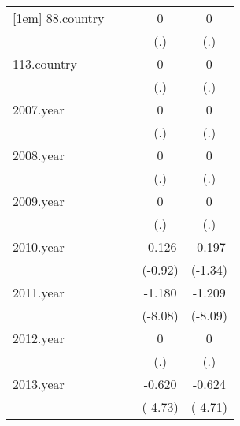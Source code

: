 {\begin{tabular}{l*{4}{c}}
[1em]
88.country  &                     &                     &           0         &           0         \\
            &                     &                     &         (.)         &         (.)         \\
[1em]
113.country &                     &                     &           0         &           0         \\
            &                     &                     &         (.)         &         (.)         \\
[1em]
2007.year   &                     &                     &           0         &           0         \\
            &                     &                     &         (.)         &         (.)         \\
[1em]
2008.year   &                     &                     &           0         &           0         \\
            &                     &                     &         (.)         &         (.)         \\
[1em]
2009.year   &                     &                     &           0         &           0         \\
            &                     &                     &         (.)         &         (.)         \\
[1em]
2010.year   &                     &                     &      -0.126         &      -0.197         \\
            &                     &                     &     (-0.92)         &     (-1.34)         \\
[1em]
2011.year   &                     &                     &      -1.180\sym{***}&      -1.209\sym{***}\\
            &                     &                     &     (-8.08)         &     (-8.09)         \\
[1em]
2012.year   &                     &                     &           0         &           0         \\
            &                     &                     &         (.)         &         (.)         \\
[1em]
2013.year   &                     &                     &      -0.620\sym{***}&      -0.624\sym{***}\\
            &                     &                     &     (-4.73)         &     (-4.71)         \\

\end{tabular}}
